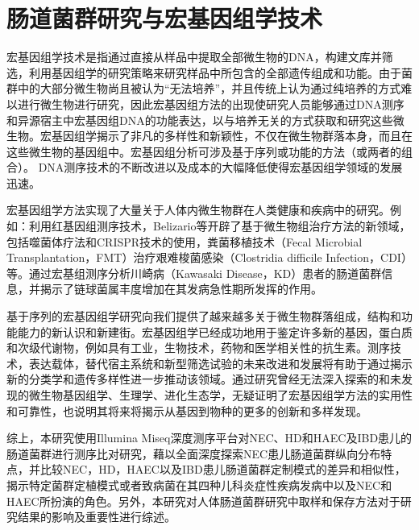 \section{肠道菌群研究与宏基因组学技术}
宏基因组学技术是指通过直接从样品中提取全部微生物的DNA，构建文库并筛选，利用基因组学的研究策略来研究样品中所包含的全部遗传组成和功能。由于菌群中的大部分微生物尚且被认为“无法培养”，并且传统上认为通过纯培养的方式难以进行微生物进行研究，因此宏基因组方法的出现使研究人员能够通过DNA测序和异源宿主中宏基因组DNA的功能表达，以与培养无关的方式获取和研究这些微生物。宏基因组学揭示了非凡的多样性和新颖性，不仅在微生物群落本身，而且在这些微生物的基因组中。宏基因组分析可涉及基于序列或功能的方法（或两者的组合）。 DNA测序技术的不断改进以及成本的大幅降低使得宏基因组学领域的发展迅速。

宏基因组学方法实现了大量关于人体内微生物群在人类健康和疾病中的研究。例如：利用红基因组测序技术，Belizario等开辟了基于微生物组治疗方法的新领域，包括噬菌体疗法和CRISPR技术的使用，粪菌移植技术（Fecal Microbial Transplantation，FMT）治疗艰难梭菌感染（Clostridia difficile Infection，CDI）等\cite{belizario2015human}。通过宏基组测序分析川崎病（Kawasaki Disease，KD）患者的肠道菌群信息，并揭示了链球菌属丰度增加在其发病急性期所发挥的作用\cite{kinumaki2015characterization}。

基于序列的宏基因组学研究向我们提供了越来越多关于微生物群落组成，结构和功能能力的新认识和新建街。宏基因组学已经成功地用于鉴定许多新的基因，蛋白质和次级代谢物，例如具有工业，生物技术，药物和医学相关性的抗生素。测序技术，表达载体，替代宿主系统和新型筛选试验的未来改进和发展将有助于通过揭示新的分类学和遗传多样性进一步推动该领域。通过研究曾经无法深入探索的和未发现的微生物基因组学、生理学、进化生态学，无疑证明了宏基因组学方法的实用性和可靠性，也说明其将来将揭示从基因到物种的更多的创新和多样发现。

综上，本研究使用Illumina Miseq深度测序平台对NEC、HD和HAEC及IBD患儿的肠道菌群进行测序比对研究，藉以全面深度探索NEC患儿肠道菌群纵向分布特点，并比较NEC，HD，HAEC以及IBD患儿肠道菌群定制模式的差异和相似性，揭示特定菌群定植模式或者致病菌在其四种儿科炎症性疾病发病中以及NEC和HAEC所扮演的角色。另外，本研究对人体肠道菌群研究中取样和保存方法对于研究结果的影响及重要性进行综述。
